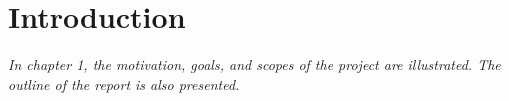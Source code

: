 \section{Introduction}

\textit{In chapter 1, the motivation, goals, and scopes of the project are illustrated. The outline of the report is also presented.}
